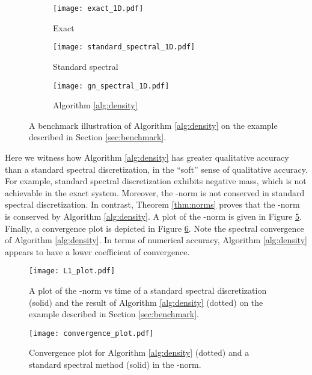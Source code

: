 \documentclass[final,leqno]{amsart}
\begin{document}
\begin{figure}[h!]
	\hspace*{-.5cm}
	\begin{subfigure}{0.36\textwidth}
		\texttt{[image: exact\_1D.pdf]}
		\caption{Exact}
		\label{fig:exact}
	\end{subfigure}
	\hspace*{-.65cm}
	\begin{subfigure}{0.36\textwidth}
		\texttt{[image: standard\_spectral\_1D.pdf]}
		\caption{Standard spectral}
		\label{fig:standard spectral}
	\end{subfigure}
	\hspace*{-.65cm}
	\begin{subfigure}{0.36\textwidth}
		\texttt{[image: gn\_spectral\_1D.pdf]}
		\caption{Algorithm \ref{alg:density}}
		\label{fig:gn spectral}
	\end{subfigure}
	\caption{A benchmark illustration of Algorithm \ref{alg:density} on the example described in Section \ref{sec:benchmark}.}
	\label{fig:S1}
\end{figure}

Here we witness how Algorithm \ref{alg:density} has greater qualitative accuracy than a standard spectral discretization, in the ``soft'' sense of qualitative accuracy.
For example, standard spectral discretization exhibits negative mass, which is not achievable in the exact system.
Moreover, the -norm is not conserved in standard spectral discretization.  
In contrast, Theorem \ref{thm:norms} proves that the -norm is conserved by Algorithm \ref{alg:density}.
A plot of the -norm is given in Figure \ref{fig:L1}.
Finally, a convergence plot is depicted in Figure \ref{fig:convergence}.  
Note the spectral convergence of Algorithm \ref{alg:density}.
In terms of numerical accuracy, Algorithm \ref{alg:density} appears to have a lower coefficient of convergence.

\begin{figure}[h!]
	\hspace*{-1.2cm}
	\centering
	\texttt{[image: L1\_plot.pdf]}
	\caption{A plot of the -norm vs time of a standard spectral discretization (solid) and the result of Algorithm \ref{alg:density} (dotted) on the example described in Section \ref{sec:benchmark}.}
	\label{fig:L1}
\end{figure}

\begin{figure}[h!]
	\hspace*{-1.2cm}
	\centering
	\texttt{[image: convergence\_plot.pdf]}
	\caption{Convergence plot for Algorithm \ref{alg:density} (dotted) and a standard spectral method (solid) in the -norm.}
	\label{fig:convergence}
\end{figure}
\end{document}
